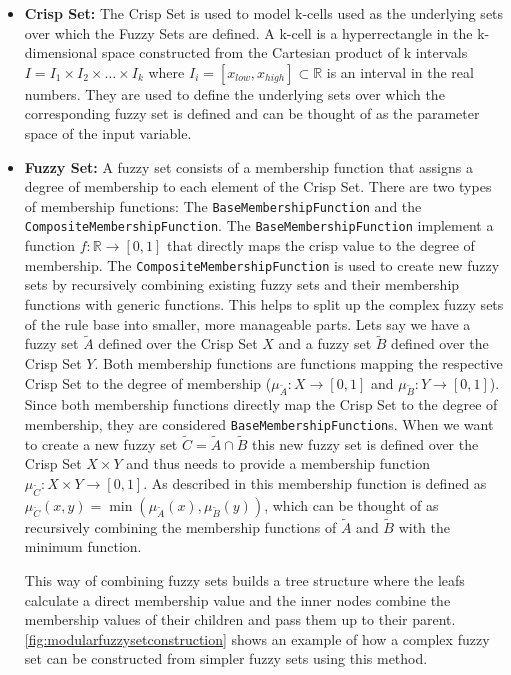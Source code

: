 \begin{itemize}
  \item \textbf{Crisp Set:} The Crisp Set is used to model k-cells used as the underlying sets over which the Fuzzy Sets are defined. A k-cell is a hyperrectangle in the k-dimensional space constructed from the Cartesian product of k intervals $I = I_1 \times I_2 \times \ldots \times I_k$ where $I_i = [x_{low}, x_{high}] \subset \mathbb{R} $ is an interval in the real numbers. They are used to define the underlying sets over which the corresponding fuzzy set is defined and can be thought of as the parameter space of the input variable.


  \item \textbf{Fuzzy Set:} A fuzzy set consists of a membership function that assigns a degree of membership to each element of the Crisp Set. There are two types of membership functions: The \texttt{BaseMembershipFunction} and the \texttt{CompositeMembershipFunction}. The \texttt{BaseMembershipFunction} implement a function $f: \mathbb{R} \rightarrow [0, 1]$ that directly maps the crisp value to the degree of membership. The \texttt{CompositeMembershipFunction} is used to create new fuzzy sets by recursively combining existing fuzzy sets and their membership functions with generic functions. This helps to split up the complex fuzzy sets of the rule base into smaller, more manageable parts. Lets say we have a fuzzy set $\tilde{A}$ defined over the Crisp Set $X$ and a fuzzy set $\tilde{B}$ defined over the Crisp Set $Y$. Both membership functions are functions mapping the respective Crisp Set to the degree of membership ($\mu_{\tilde{A}}: X \rightarrow [0, 1]$ and $\mu_{\tilde{B}}: Y \rightarrow [0, 1]$). Since both membership functions directly map the Crisp Set to the degree of membership, they are considered \texttt{BaseMembershipFunction}s. When we want to create a new fuzzy set $\tilde{C} = \tilde{A} \cap \tilde{B}$ this new fuzzy set is defined over the Crisp Set $X \times Y$  and thus needs to provide a membership function $\mu_{\tilde{C}}: X \times Y \rightarrow [0, 1]$. As described in  this membership function is defined as $\mu_{\tilde{C}}(x, y) = \min(\mu_{\tilde{A}}(x), \mu_{\tilde{B}}(y))$, which can be thought of as recursively combining the membership functions of $\tilde{A}$ and $\tilde{B}$ with the minimum function.

        This way of combining fuzzy sets builds a tree structure where the leafs calculate a direct membership value and the inner nodes combine the membership values of their children and pass them up to their parent. \autoref{fig:modularfuzzysetconstruction} shows an example of how a complex fuzzy set can be constructed from simpler fuzzy sets using this method.


\end{itemize}
